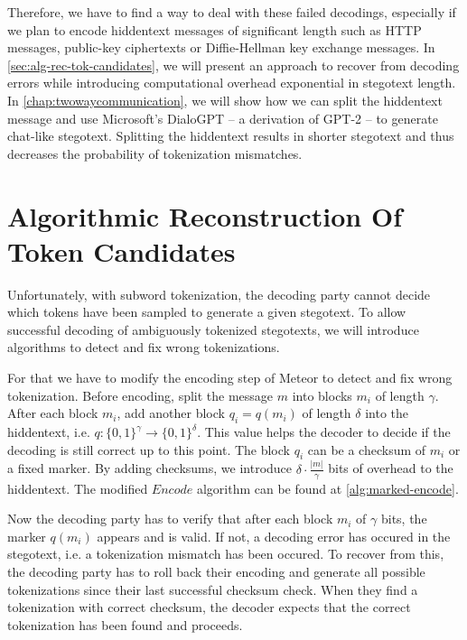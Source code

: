 Therefore, we have to find a way to deal with these failed decodings, especially if we plan to encode hiddentext messages of significant length such as HTTP messages, public-key ciphertexts or Diffie-Hellman key exchange messages.
In \autoref{sec:alg-rec-tok-candidates}, we will present an approach to recover from decoding errors while introducing computational overhead exponential in stegotext length. 
In \autoref{chap:twowaycommunication}, we will show how we can split the hiddentext message and use Microsoft's DialoGPT -- a derivation of GPT-2 -- to generate chat-like stegotext.
Splitting the hiddentext results in shorter stegotext and thus decreases the probability of tokenization mismatches.



\section{Algorithmic Reconstruction Of Token Candidates}
\label{sec:alg-rec-tok-candidates}

Unfortunately, with subword tokenization, the decoding party cannot decide which tokens have been sampled to generate a given stegotext.
To allow successful decoding of ambiguously tokenized stegotexts, we will introduce algorithms to detect and fix wrong tokenizations.


For that we have to modify the encoding step of Meteor to detect and fix wrong tokenization.
Before encoding, split the message $m$ into blocks $m_i$ of length $\gamma$. 
After each block $m_i$, add another block $q_i = q(m_i)$ of length $\delta$ into the hiddentext, i.e. $q \colon \{ 0,1 \}^\gamma \rightarrow \{ 0,1 \}^\delta$.
This value helps the decoder to decide if the decoding is still correct up to this point.
The block $q_i$ can be a checksum of $m_i$ or a fixed marker.
By adding checksums, we introduce $\delta \cdot \frac{|m|}{\gamma}$ bits of overhead to the hiddentext.
The modified $Encode$ algorithm can be found at \autoref{alg:marked-encode}.

Now the decoding party has to verify that after each block $m_i$ of $\gamma$ bits, the marker $q(m_i)$ appears and is valid.
If not, a decoding error has occured in the stegotext, i.e. a tokenization mismatch has been occured.
To recover from this, the decoding party has to roll back their encoding and generate all possible tokenizations since their last successful checksum check.
When they find a tokenization with correct checksum, the decoder expects that the correct tokenization has been found and proceeds.

